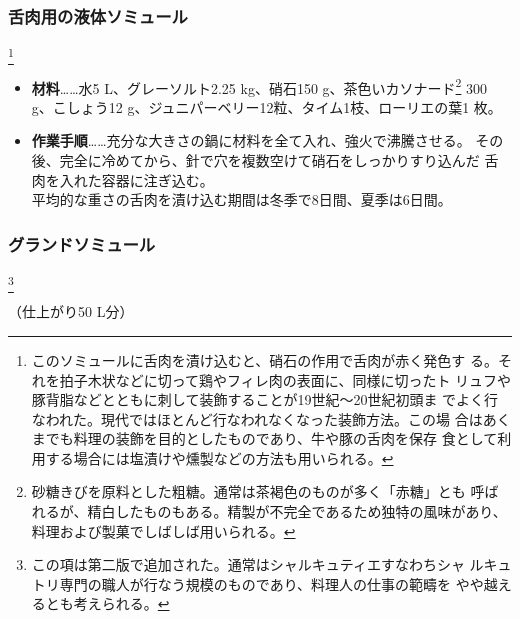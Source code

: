 \begin{recette}
\maeaki

\hypertarget{saumure-liquide-pour-langues}{%
\subsubsection{舌肉用の液体ソミュール}\label{saumure-liquide-pour-langues}}

\footnote{このソミュールに舌肉を漬け込むと、硝石の作用で舌肉が赤く発色す
  る。それを拍子木状などに切って鶏やフィレ肉の表面に、同様に切ったト
  リュフや豚背脂などとともに刺して装飾することが19世紀〜20世紀初頭ま
  でよく行なわれた。現代ではほとんど行なわれなくなった装飾方法。この場
  合はあくまでも料理の装飾を目的としたものであり、牛や豚の舌肉を保存
  食として利用する場合には塩漬けや燻製などの方法も用いられる。}


\begin{itemize}
\item
  \textbf{材料}\ldots{}\ldots{}水5 L、グレーソルト2.25 kg、硝石150
  g、茶色いカソナード\footnote{砂糖きびを原料とした粗糖。通常は茶褐色のものが多く「赤糖」とも
    呼ばれるが、精白したものもある。精製が不完全であるため独特の風味があり、
    料理および製菓でしばしば用いられる。} 300 g、こしょう12
  g、ジュニパーベリー12粒、タイム1枝、ローリエの葉1 枚。
\item
  \textbf{作業手順}\ldots{}\ldots{}充分な大きさの鍋に材料を全て入れ、強火で沸騰させる。
  その後、完全に冷めてから、針で穴を複数空けて硝石をしっかりすり込んだ
  舌肉を入れた容器に注ぎ込む。\\
  平均的な重さの舌肉を漬け込む期間は冬季で8日間、夏季は6日間。
\end{itemize}

\hypertarget{grande-saumure}{%
\subsubsection{グランドソミュール}\label{grande-saumure}}

\footnote{この項は第二版で追加された。通常はシャルキュティエすなわちシャ
  ルキュトリ専門の職人が行なう規模のものであり、料理人の仕事の範疇を
  やや越えるとも考えられる。}


（仕上がり50 L分）


\end{recette}
